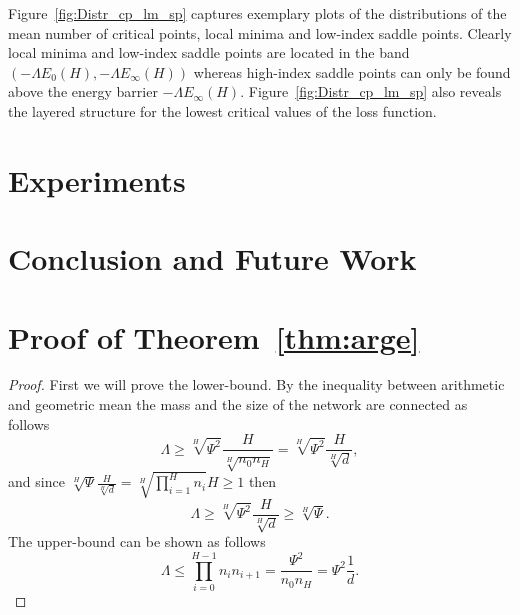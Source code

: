 \documentclass[twoside]{article}
\begin{document}
Figure~\ref{fig:Distr_cp_lm_sp} captures exemplary plots of the distributions of the mean number of critical points, local minima and low-index saddle points. Clearly local minima and low-index saddle points are located in the band $\left(-\Lambda E_0(H),-\Lambda E_{\infty}(H)\right)$ whereas high-index saddle points can only be found above the energy barrier $-\Lambda E_{\infty}(H)$. Figure~\ref{fig:Distr_cp_lm_sp} also reveals the layered structure for the lowest critical values of the loss function. 

\section{Experiments}
\label{sec:Experiments}

\section{Conclusion and Future Work}
\label{sec:ConandFutWork}




\clearpage

\toptitlebar 
{\Large \bf  {} \par}
\bottomtitlebar

\section{Proof of Theorem~\ref{thm:arge}}
\begin{proof}
First we will prove the lower-bound. By the inequality between arithmetic and geometric mean the mass and the size of the network are connected as follows
\[\Lambda \geq \sqrt[H]{\Psi^2}\frac{H}{\sqrt[H]{n_0n_H}} = \sqrt[H]{\Psi^2}\frac{H}{\sqrt[H]{d}},
\]
and since $\sqrt[H]{\Psi}\frac{H}{\sqrt[H]{d}} = \sqrt[H]{\prod_{i = 1}^{H}n_i}H \geq 1$ then 
\[\Lambda \geq \sqrt[H]{\Psi^2}\frac{H}{\sqrt[H]{d}} \geq \sqrt[H]{\Psi}.
\]
The upper-bound can be shown as follows
\[\Lambda \leq \prod_{i=0}^{H-1}n_in_{i+1} = \frac{\Psi^2}{n_0n_H} = \Psi^2\frac{1}{d}.
\]
\end{proof}
\end{document}
